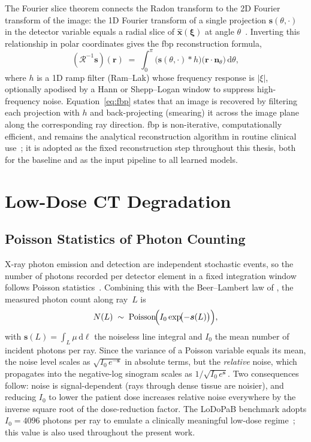 The Fourier slice theorem connects the Radon transform to the 2D Fourier transform of the image: the 1D Fourier transform of a single projection $\boldsymbol{s}(\theta,\cdot)$ in the detector variable equals a radial slice of $\hat{\boldsymbol{x}}(\boldsymbol{\xi})$ at angle $\theta$~\cite{KakSlaney1988}. Inverting this relationship in
polar coordinates gives the \gls{fbp} reconstruction formula,
\begin{equation}
    (\mathcal{R}^{-1}\boldsymbol{s})(\boldsymbol{r}) \;=\; \int_{0}^{\pi}\!
        \bigl(\boldsymbol{s}(\theta, \cdot) * h\bigr)\!\bigl(\boldsymbol{r}\!\cdot\!\boldsymbol{n}_{\theta}\bigr)\,\mathrm{d}\theta,
    \label{eq:fbp}
\end{equation}
where $h$ is a 1D ramp filter (Ram--Lak) whose frequency response is $|\xi|$, optionally apodised by a Hann or Shepp--Logan window to suppress high-frequency noise. Equation~\eqref{eq:fbp} states that an image is recovered by filtering each projection with $h$ and back-projecting (smearing) it across the image plane along the corresponding ray direction. \gls{fbp} is non-iterative, computationally efficient, and remains the analytical reconstruction algorithm in routine clinical use~\cite{KakSlaney1988, Buzug2008}; it is adopted as the fixed reconstruction step throughout this thesis, both for the baseline and as the input pipeline to all learned models.

\section{Low-Dose CT Degradation}
\label{sec:bg_ldct_degradation}

\subsection{Poisson Statistics of Photon Counting}
\label{subsec:bg_poisson}

X-ray photon emission and detection are independent stochastic events, so the number of photons recorded per detector element in a fixed integration window follows
Poisson statistics~\cite{Leuschner2021, Sadia2024}. Combining this with the Beer--Lambert law of , the measured photon count along ray~$L$ is
\begin{equation}
    N(L) \;\sim\; \mathrm{Poisson}\!\Bigl(I_{0}\exp\!\bigl(-\boldsymbol{s}(L)\bigr)\Bigr),
    \label{eq:poisson}
\end{equation}
with $\boldsymbol{s}(L) = \int_{L}\mu\,\mathrm{d}\ell$ the noiseless line integral and $I_0$ the mean number of incident photons per ray. Since the variance of a
Poisson variable equals its mean, the noise level scales as $\sqrt{I_0\,e^{-\boldsymbol{s}}}$ in absolute terms, but the \emph{relative} noise, which propagates into the negative-log sinogram scales as $1/\sqrt{I_0\,e^{\boldsymbol{s}}}$. Two consequences follow: noise is signal-dependent (rays through dense tissue are noisier), and reducing $I_0$ to lower the patient dose increases relative noise everywhere by the inverse square root of the dose-reduction factor. The LoDoPaB benchmark adopts $I_0 = 4096$ photons per ray to emulate a clinically meaningful low-dose regime~\cite{Leuschner2021}; this value is also used throughout the present work.

